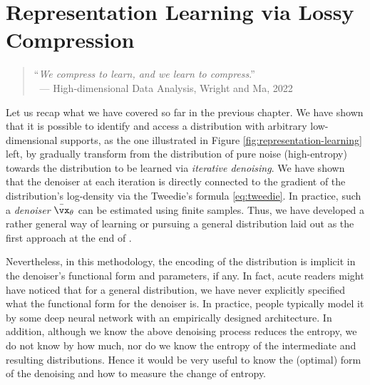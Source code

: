 \documentclass[../../book-main.tex]{subfiles}
\begin{document}
\chapter{Representation Learning via Lossy Compression}
\label{ch:lossy-compression}\label{ch:representation-learning}

\begin{quote}
	\hfill    ``{\em We compress to learn, and we learn to compress}.''\\
	$~$ \hfill --- High-dimensional Data Analysis, Wright and Ma, 2022
\end{quote}
\vspace{5mm}



Let us recap what we have covered so far in the previous chapter. We have shown that it is possible to identify and access a distribution with arbitrary low-dimensional supports, as the one illustrated in  Figure \ref{fig:representation-learning} left, by gradually transform from the distribution of pure noise (high-entropy) towards the distribution to be learned via \textit{iterative denoising}. We have shown that the denoiser at each iteration is directly connected to the gradient of the distribution's log-density via the Tweedie's formula \eqref{eq:tweedie}. In practice, such a \textit{denoiser} \(\bar{\vx}_{\theta}\) can be estimated using finite samples. Thus, we have developed a rather general  way of learning or pursuing a general distribution laid out as the first approach at the end of .

Nevertheless, in this methodology, the encoding of the distribution is implicit in the denoiser's functional form and parameters, if any. In fact, acute readers might have noticed that for a general distribution, we have never explicitly specified what the functional form for the denoiser is. In practice, people typically model it by some deep neural network with an empirically designed architecture. In addition, although we know the above denoising process reduces the entropy, we do not know by how much, nor do we know the entropy of the intermediate and resulting distributions. Hence it would be very useful to know  the (optimal) form of the denoising and how to measure the change of entropy.
\end{document}
